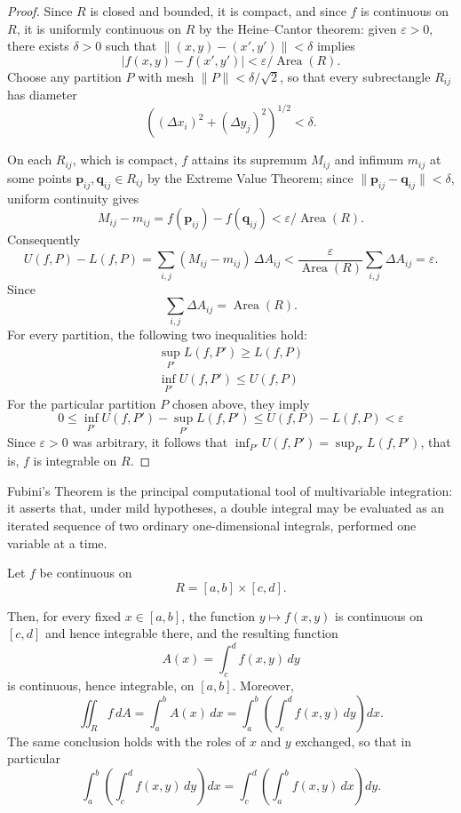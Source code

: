 \begin{proof}
Since $R$ is closed and bounded, it is compact, and since $f$ is continuous on $R$, it is uniformly continuous on $R$ by the Heine--Cantor theorem: given $\varepsilon>0$, there exists $\delta>0$ such that $\|(x,y)-(x',y')\| < \delta$ implies
\[
|f(x,y)-f(x',y')| < \varepsilon / \operatorname{Area}(R).
\]
Choose any partition $P$ with mesh $\|P\| < \delta/\sqrt{2}$, so that every subrectangle $R_{ij}$ has diameter
\[
((\Delta x_i)^2 + (\Delta y_j)^2)^{1/2} < \delta.
\]

On each $R_{ij}$, which is compact, $f$ attains its supremum $M_{ij}$ and infimum $m_{ij}$ at some points $\mathbf{p}_{ij}, \mathbf{q}_{ij} \in R_{ij}$ by the Extreme Value Theorem; since $\|\mathbf{p}_{ij}-\mathbf{q}_{ij}\| < \delta$, uniform continuity gives
\[
M_{ij}-m_{ij} = f(\mathbf{p}_{ij})-f(\mathbf{q}_{ij}) < \varepsilon/\operatorname{Area}(R).
\]
Consequently
\[
U(f,P) - L(f,P) = \sum_{i,j}(M_{ij}-m_{ij})\,\Delta A_{ij} < \frac{\varepsilon}{\operatorname{Area}(R)}\sum_{i,j}\Delta A_{ij} = \varepsilon.
\]
Since
\[
\sum_{i,j}\Delta A_{ij} = \operatorname{Area}(R).
\]
For every partition, the following two inequalities hold:
\[
\begin{gathered}
\sup_{P'}L(f,P') \geq L(f,P) \\
\inf_{P'}U(f,P') \leq U(f,P)
\end{gathered}
\]
For the particular partition $P$ chosen above, they imply
\[
0 \leq \inf_{P'}U(f,P') - \sup_{P'}L(f,P') \leq U(f,P)-L(f,P) < \varepsilon
\]
Since $\varepsilon>0$ was arbitrary, it follows that $\inf_{P'}U(f,P') = \sup_{P'}L(f,P')$, that is, $f$ is integrable on $R$.
\end{proof}

Fubini's Theorem is the principal computational tool of multivariable integration: it asserts that, under mild hypotheses, a double integral may be evaluated as an iterated sequence of two ordinary one-dimensional integrals, performed one variable at a time.

\begin{theorem}
Let $f$ be continuous on
\[
R = [a,b]\times[c,d].
\]

Then, for every fixed $x \in [a,b]$, the function $y \mapsto f(x,y)$ is continuous on $[c,d]$ and hence integrable there, and the resulting function \[
A(x) = \int_c^d f(x,y)\, dy
\] is continuous, hence integrable, on $[a,b]$. Moreover,
\[
\iint_R f\, dA = \int_a^b A(x)\, dx = \int_a^b \left( \int_c^d f(x,y)\, dy \right) dx.
\]
The same conclusion holds with the roles of $x$ and $y$ exchanged, so that in particular
\[
\int_a^b \left( \int_c^d f(x,y)\, dy \right) dx = \int_c^d \left( \int_a^b f(x,y)\, dx \right) dy.
\]

\end{theorem}

